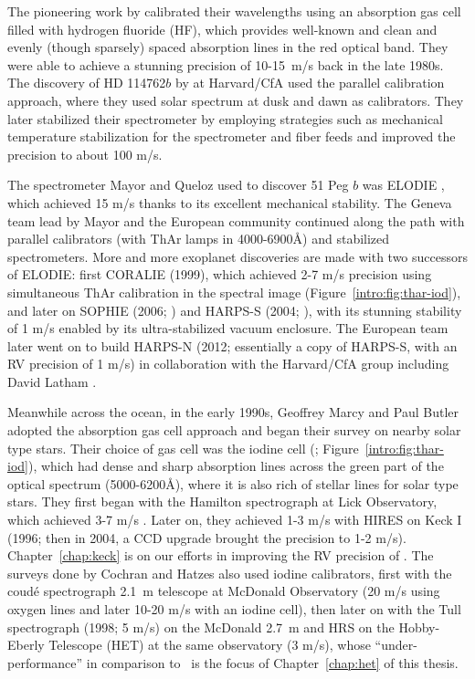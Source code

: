 The pioneering work by \cite{1988ApJ...331..902C} calibrated their
wavelengths using an absorption gas cell filled with hydrogen fluoride
(HF), which provides well-known and clean and evenly (though sparsely)
spaced absorption lines in the red optical band. They were able to
achieve a stunning precision of 10-15~m/s back in the late 1980s. The
discovery of HD 114762$b$ by \cite{1989Natur.339...38L} at Harvard/CfA
used the parallel calibration approach, where they used solar spectrum
at dusk and dawn as calibrators. They later stabilized their
spectrometer by employing strategies such as mechanical temperature
stabilization for the spectrometer and fiber feeds and improved the
precision to about 100 m/s.

The spectrometer Mayor and Queloz used to discover 51 Peg $b$ was
ELODIE \citep{elodie}, which achieved 15 m/s thanks to its excellent
mechanical stability. The Geneva team lead by Mayor and the European
community continued along the path with parallel calibrators (with
ThAr lamps in 4000-6900\AA) and stabilized spectrometers. More and
more exoplanet discoveries are made with two successors of ELODIE:
first CORALIE (1999), which achieved 2-7 m/s precision using
simultaneous ThAr calibration in the spectral image
(Figure~\ref{intro:fig:thar-iod}), and later on SOPHIE (2006;
\citealt{2008SPIE.7014E..0JP}) and HARPS-S (2004; \citealt{harps-s}),
with its stunning stability of 1 m/s enabled by its ultra-stabilized
vacuum enclosure. The European team later went on to build HARPS-N
(2012; essentially a copy of HARPS-S, with an RV precision of 1 m/s) in
collaboration with the Harvard/CfA group including David Latham
\citep{2012SPIE.8446E..1VC}. 

Meanwhile across the ocean, in the early 1990s, Geoffrey Marcy and
Paul Butler adopted the absorption gas cell approach and began their
survey on nearby solar type stars. Their choice of gas cell was the
iodine cell (\citealt{1992PASP..104..270M};
Figure~\ref{intro:fig:thar-iod}), which had dense and sharp absorption
lines across the green part of the optical spectrum (5000-6200\AA),
where it is also rich of stellar lines for solar type stars. They
first began with the Hamilton spectrograph at Lick Observatory, which
achieved 3-7 m/s \citep{2014ApJS..210....5F}. Later on, they achieved
1-3 m/s with HIRES on Keck I (1996; then in 2004, a CCD upgrade
brought the precision to 1-2 m/s). Chapter~\ref{chap:keck} is on our
efforts in improving the RV precision of \keck. The surveys done by
Cochran and Hatzes also used iodine calibrators, first with the
coud\'e spectrograph 2.1~m telescope at McDonald Observatory (20 m/s
using oxygen lines and later 10-20 m/s with an iodine cell), then
later on with the Tull spectrograph (1998; 5 m/s) on the McDonald
2.7~m and HRS on the Hobby-Eberly Telescope (HET) at the same
observatory (3 m/s), whose ``under-performance'' in comparison to
\keck\ is the focus of Chapter~\ref{chap:het} of this thesis.

